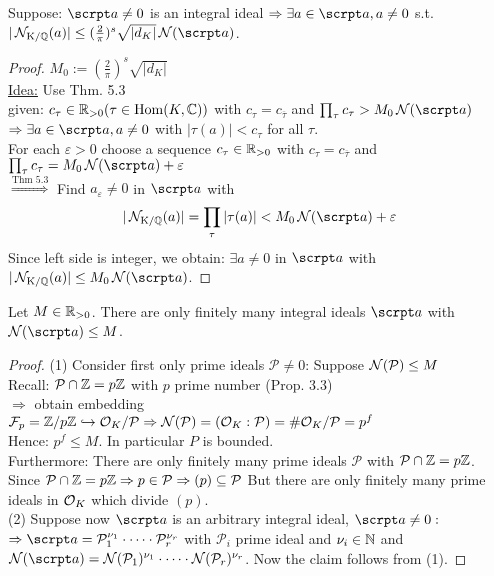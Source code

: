 \begin{Lem}
Suppose: $\a \neq 0$ is an integral ideal $\Rightarrow \exists a \in \a, a \neq 0$ s.t. $|\NormKQ(a)| \leq (\frac{2}{\pi})^s \sqrt{|d_K|} \Norm(\a)$.
\end{Lem}
\begin{proof}
$M_0:= (\frac{2}{\pi})^s \sqrt{|d_K|}$\\
\underline{Idea:} Use \glqq Thm. 5.3 \grqq\\
given: $c_\tau \in \mathbb{R}_{>0} (\tau \in \operatorname{Hom}(K, \mathbb{C}))$ with $c_\tau = c_{\overline{\tau}}$ and $\prod_\tau c_\tau > M_0 \Norm(\a)$\\
$\Rightarrow \exists a \in \a, a \neq 0$ with $|\tau(a)| < c_\tau$ for all $\tau$.\\
For each $\varepsilon >0$ choose a sequence $c_\tau \in \mathbb{R}_{>0}$ with $c_\tau = c_{\overline{\tau}}$ and $\prod_\tau c_\tau = M_0 \Norm(\a) + \varepsilon$\\
$\stackrel{\text{Thm 5.3}}{\Rightarrow}$ Find $a_\varepsilon \neq 0$ in $\a$ with
\[ |\NormKQ(a)| = \prod_\tau |\tau(a)| < M_0\Norm(\a) + \varepsilon\]
Since left side is integer, we obtain: $\exists a \neq 0$ in $\a$ with $|\NormKQ(a)| \leq M_0\Norm(\a)$.
\end{proof}

\begin{Lem}
Let $M \in \mathbb{R}_{>0}$. There are only finitely many integral ideals $\a$ with $\Norm(\a) \leq M$.
\end{Lem}

\begin{proof}
(1) Consider first only prime ideals $\mathcal{P} \neq 0$: Suppose $\operatorname{\mathcal{N}}(\mathcal{P}) \leq M$\\
Recall: $\mathcal{P} \cap \mathbb{Z} = p \mathbb{Z}$ with $p$ prime number (Prop. 3.3)\\
$\Rightarrow$ obtain embedding $\mathcal{F}_p = \mathbb{Z} / p\mathbb{Z} \hookrightarrow \mathcal{O}_K / \mathcal{P} \Rightarrow \operatorname{\mathcal{N}}(\mathcal{P})= (\mathcal{O}_K : \mathcal{P}) = \# \mathcal{O}_K/\mathcal{P} = p^f$\\
Hence: $p^f \leq M$. In particular $P$ is bounded.\\
Furthermore: There are only finitely many prime ideals $\mathcal{P}$ with $\mathcal{P} \cap \mathbb{Z}= p \mathbb{Z}$.\\
Since $\mathcal{P} \cap \mathbb{Z}=p\mathbb{Z} \Rightarrow p \in \mathcal{P} \Rightarrow (p) \subseteq \mathcal{P}$ But there are only finitely many prime ideals in $\mathcal{O}_K$ which divide $(p)$.\\
(2) Suppose now $\a$ is an arbitrary integral ideal, $\a \neq 0:$\\
$\Rightarrow \a=\mathcal{P}_1^{\nu_1}\cdot \dots \cdot \mathcal{P}_r^{\nu_r}$ with $\mathcal{P}_i$ prime ideal and $\nu_i \in \mathbb{N}$ and $\Norm(\a)= \Norm(\mathcal{P}_1)^{\nu_1}\cdot \dots \cdot \Norm(\mathcal{P}_r)^{\nu_r}$.
Now the claim follows from (1).
\end{proof}

